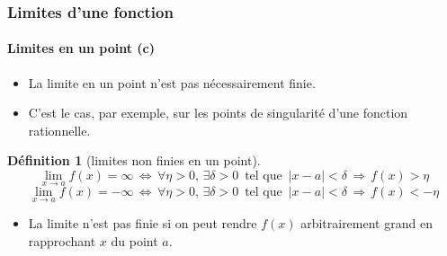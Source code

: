 \documentclass[10pt,notheorems]{beamer}
\theoremstyle{plain}
\theoremstyle{definition} %
\newtheorem{definition}{Définition}
\begin{document}
\begin{frame}
  \frametitle{Limites d'une fonction}
  \framesubtitle{Limites en un point (c)}

  \begin{itemize}

  \item La limite en un point n'est pas nécessairement finie.\newline

  \item C'est le cas, par exemple, sur les points de singularité d'une fonction rationnelle.\newline

  \end{itemize}

  \begin{definition}[limites non finies en un point]
    \[
      \lim_{x\rightarrow a}f(x) = \infty \,\Leftrightarrow\, \forall \eta>0,\, \exists \delta>0\,\text{ tel que }\, |x-a|<\delta\,\Rightarrow\, f(x)>\eta
    \]
    \[
      \lim_{x\rightarrow a}f(x) = -\infty \,\Leftrightarrow\, \forall \eta>0,\, \exists \delta>0\,\text{ tel que }\, |x-a|<\delta\,\Rightarrow\, f(x)<-\eta
    \]
  \end{definition}

  \bigskip

  \begin{itemize}

  \item La limite n'est pas finie si on peut rendre $f(x)$ arbitrairement grand en rapprochant $x$ du point $a$.
  \end{itemize}

\end{frame}
\end{document}
